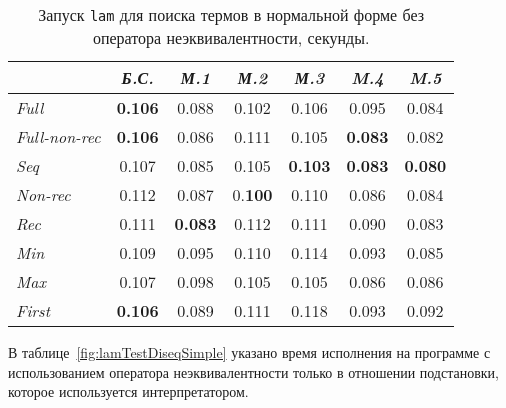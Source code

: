 \begin{table}[h!]
\center
\begin{tabular}{|l|c|c|c|c|c|c|}
\hline
   &{\it Б.С.}&{\it М.1}&{\it М.2}&{\it М.3}&{\it M.4}&{\it M.5} \\ \hline

{\it Full        } & {\bf 0.106}& 0.088     & 0.102       & 0.106       & 0.095       & 0.084 \\ \hline
{\it Full-non-rec} & {\bf 0.106}& 0.086     & 0.111       & 0.105       & {\bf 0.083} & 0.082 \\ \hline
{\it Seq         } & 0.107      & 0.085     & 0.105       & {\bf 0.103} & {\bf 0.083} & {\bf 0.080} \\ \hline
{\it Non-rec     } & 0.112      & 0.087     & 0.{\bf 100} & 0.110       & 0.086       & 0.084 \\ \hline
{\it Rec         } & 0.111      &{\bf 0.083}& 0.112       & 0.111       & 0.090       & 0.083 \\ \hline
{\it Min         } & 0.109      & 0.095     & 0.110       & 0.114       & 0.093       & 0.085 \\ \hline
{\it Max         } & 0.107      & 0.098     & 0.105       & 0.105       & 0.086       & 0.086 \\ \hline
{\it First       } & {\bf 0.106}& 0.089     & 0.111       & 0.118       & 0.093       & 0.092 \\ \hline
\end{tabular}
\caption{Запуск \lstinline{lam} для поиска термов в нормальной форме без оператора неэквивалентности, секунды.}
\label{fig:lamTestSimple}
\end{table}

В таблице~\ref{fig:lamTestDiseqSimple} указано время исполнения на программе с
использованием оператора неэквивалентности только в отношении подстановки, которое
используется интерпретатором.

